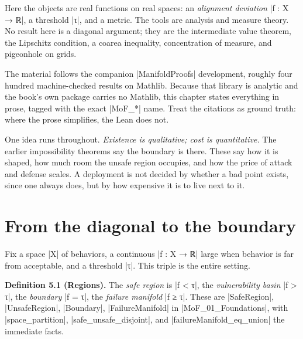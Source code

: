 \documentclass{memoir}
\begin{document}
Here the objects are real functions on real spaces: an \emph{alignment deviation} \LeanVerb|f : X → ℝ|,
a threshold \LeanVerb|τ|, and a metric. The tools are analysis and measure theory. No
result here is a diagonal argument; they are the intermediate value theorem, the
Lipschitz condition, a coarea inequality, concentration of measure, and
pigeonhole on grids.

The material follows the companion \LeanVerb|ManifoldProofs| development, roughly four
hundred machine-checked results on Mathlib. Because that library is analytic and
the book's own package carries no Mathlib, this chapter states everything in
prose, tagged with the exact \LeanVerb|MoF_*| name. Treat the citations as ground truth:
where the prose simplifies, the Lean does not.

One idea runs throughout. \emph{Existence is qualitative; cost is quantitative.} The
earlier impossibility theorems say the boundary is there. These say how it is
shaped, how much room the unsafe region occupies, and how the price of attack
and defense scales. A deployment is not decided by whether a bad point exists,
since one always does, but by how expensive it is to live next to it.



\section{From the diagonal to the boundary}\label{Two--Schemas--of--Impossibility-005F-005F-005F--Machine--Checked--Limits--of--Trustworthy--Machine--Learning-005F-005F-005F--and--Why--They--Tighten--with--Capability----The--Geometry--of--Attacks----From--the--diagonal--to--the--boundary}

Fix a space \LeanVerb|X| of behaviors, a continuous \LeanVerb|f : X → ℝ| large when behavior is
far from acceptable, and a threshold \LeanVerb|τ|. This triple is the entire setting.

\textbf{Definition 5.1 (Regions).} The \emph{safe region} is \LeanVerb|f < τ|, the \emph{vulnerability basin}
\LeanVerb|f > τ|, the \emph{boundary} \LeanVerb|f = τ|, the \emph{failure manifold} \LeanVerb|f ≥ τ|. These are
\LeanVerb|SafeRegion|, \LeanVerb|UnsafeRegion|, \LeanVerb|Boundary|, \LeanVerb|FailureManifold| in
\LeanVerb|MoF_01_Foundations|, with \LeanVerb|space_partition|, \LeanVerb|safe_unsafe_disjoint|, and
\LeanVerb|failureManifold_eq_union| the immediate facts.
\end{document}
